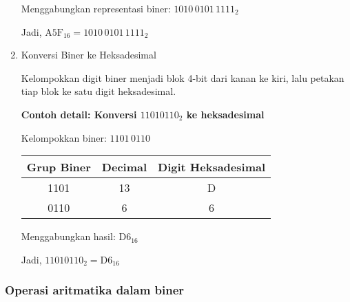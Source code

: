\documentclass[../main.tex]{subfiles}
\begin{document}
\begin{enumerate}
Menggabungkan representasi biner: \(1010\,0101\,1111_2\)

Jadi, \(\mathrm{A5F}_{16} = 1010\,0101\,1111_2\)

\item{Konversi Biner ke Heksadesimal}

Kelompokkan digit biner menjadi blok 4-bit dari kanan ke kiri, lalu petakan tiap blok ke satu digit heksadesimal.

\textbf{Contoh detail: Konversi \(11010110_2\) ke heksadesimal}

Kelompokkan biner: \(1101\,0110\)

\begin{center}
\begin{tabular}{|c|c|c|}
\hline
\textbf{Grup Biner} & \textbf{Decimal} & \textbf{Digit Heksadesimal} \\
\hline
1101 & 13 & D \\
0110 & 6 & 6 \\
\hline
\end{tabular}
\end{center}

Menggabungkan hasil: \(\mathrm{D6}_{16}\)

Jadi, \(11010110_2 = \mathrm{D6}_{16}\)

\end{enumerate}

\subsubsection{Operasi aritmatika dalam biner}
\end{document}
